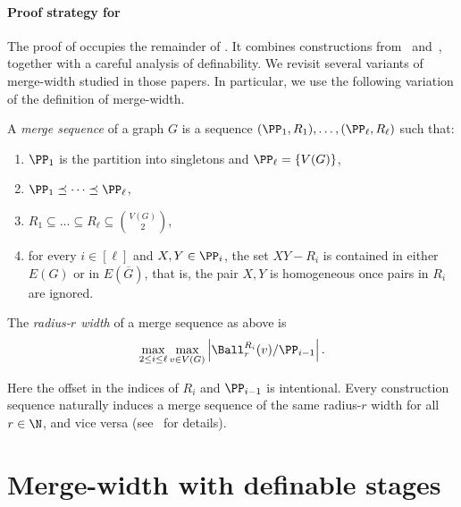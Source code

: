 \paragraph{Proof strategy for \texorpdfstring{}{the technical lemma}}\label{sec:defseq-lemma-strategy}

The proof of 
occupies the remainder of .
It combines constructions from~\cite{drabik2026variants} and~\cite{mw-stoc}, together with a careful analysis of definability.
We revisit several variants of merge-width studied in those papers.
In particular, we use the following variation of the definition of merge-width.

\begin{definition}\label{def:merge-sequence}
A \emph{merge sequence} of a graph $G$ is a sequence
$(\PP_1,R_1),\ldots,(\PP_\ell,R_\ell)$ such that:
\begin{enumerate}
  \item $\PP_1$ is the partition into
singletons and $\PP_\ell=\{V(G)\}$,
\item $\PP_1\preceq \dots\preceq \PP_\ell$,
\item $R_1\subseteq \dots\subseteq R_\ell\subseteq {V(G)\choose 2}$,
\item for every $i\in[\ell]$ and $X,Y\in \PP_i$,
the set $XY-R_i$ is contained in either $E(G)$ or in $E(\overline G)$,
 that is, the pair $X,Y$ is homogeneous once pairs in $R_i$ are ignored.
\end{enumerate}

  The \emph{radius-$r$ width} of a merge sequence as above is
\begin{equation}\label{eq:merge-seq-width}
  \max_{2\le i\le \ell}\max_{v\in V(G)}
  \left|\Ball^{R_i}_r(v)/\PP_{i-1}\right|.
\end{equation}
\end{definition}
\noindent
Here the offset in the indices of $R_i$ and $\PP_{i-1}$ is intentional.
Every construction sequence naturally induces a merge sequence of the same radius-$r$ width for all $r\in\N$, and vice versa (see~\cite{mw-arxiv,mw-stoc} for details).

\section{Merge-width with definable stages}\label{sec:better-definable-mw}
\label{sec:definable-mw}


